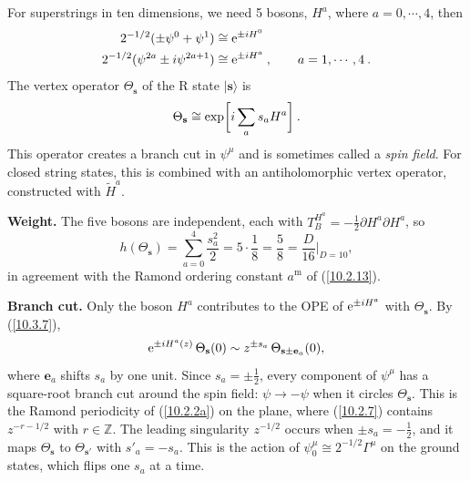 	For superstrings in ten dimensions, we need 5 bosons, $H^{a}$, where $a=0,\cdots,4$, then
	\begin{subequations}
		\begin{align}
			2^{-1/2}(\pm\psi^{0}+\psi^{1}) &\cong \mathrm{e}^{\pm i H^{0}} \label{10.3.28a}\\
			2^{-1/2}(\psi^{2a}\pm i\psi^{2a+1}) &\cong \mathrm{e}^{\pm i H^{a}} \:, \qquad a=1,\cdots,4\:. \label{10.3.28b}
		\end{align} \label{10.3.28}
	\end{subequations}
	The vertex operator $\Theta_{\mathbf{s}}$ of the R state $\lvert \mathbf{s}\rangle$ is
	\begin{equation}
		\Theta_{\mathbf{s}}\cong \exp\biggl[i\sum_{a}s_{a}H^{a}\biggr] \:. \label{10.3.29}
	\end{equation}
	This operator creates a branch cut in $\psi^{\mu}$ and is sometimes called a \emph{spin field}. For closed string states, this is combined with an antiholomorphic vertex operator, constructed with $\tilde{H}^{a}$.
	\begin{tcolorbox}[breakable]
		\begin{remark}
			\textbf{Weight.} The five bosons are independent, each with $T^{H^a}_B=-\tfrac12\partial H^a\partial H^a$, so
			\begin{equation*}
				h(\Theta_{\mathbf s})=\sum_{a=0}^{4}\frac{s_a^{2}}{2}=5\cdot\frac18=\frac58=\frac{D}{16}\Big|_{D=10},
			\end{equation*}
			in agreement with the Ramond ordering constant $a^{\mathrm m}$ of (\ref{10.2.13}).

			\textbf{Branch cut.} Only the boson $H^a$ contributes to the OPE of $\mathrm{e}^{\pm i H^a}$ with $\Theta_{\mathbf s}$. By (\ref{10.3.7}),
			\begin{equation*}
				\mathrm{e}^{\pm i H^a(z)}\,\Theta_{\mathbf s}(0)\sim z^{\pm s_a}\,\Theta_{\mathbf s\pm\mathbf e_a}(0),
			\end{equation*}
			where $\mathbf e_a$ shifts $s_a$ by one unit. Since $s_a=\pm\tfrac12$, every component of $\psi^\mu$ has a square-root branch cut around the spin field: $\psi\to-\psi$ when it circles $\Theta_{\mathbf s}$. This is the Ramond periodicity of (\ref{10.2.2a}) on the plane, where (\ref{10.2.7}) contains $z^{-r-1/2}$ with $r\in\mathds Z$. The leading singularity $z^{-1/2}$ occurs when $\pm s_a=-\tfrac12$, and it maps $\Theta_{\mathbf s}$ to $\Theta_{\mathbf s'}$ with $s'_a=-s_a$. This is the action of $\psi_0^\mu\cong2^{-1/2}\Gamma^\mu$ on the ground states, which flips one $s_a$ at a time.
		\end{remark}
	\end{tcolorbox}
	
